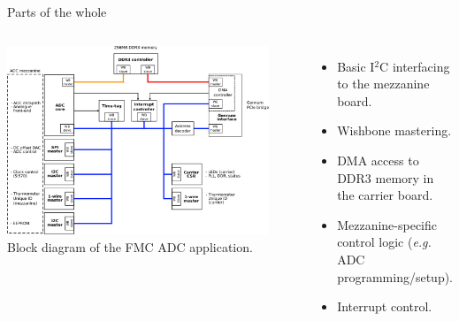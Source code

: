 \documentclass[compress,red]{beamer}
\begin{document}
\begin{frame}{Parts of the whole}
\begin{columns}[c]
   \centering
   \includegraphics[width=0.9\textwidth]{firmware_arch.pdf}
   \vspace{1pc}
   {\footnotesize
       Block diagram of the FMC ADC application.}
\footnotesize
\begin{itemize}
\pause\item Basic I${}^2$C interfacing to the mezzanine board.
\pause\item Wishbone mastering.
\pause\item DMA access to DDR3 memory in the carrier board.
\pause\item Mezzanine-specific control logic (\emph{e.g.} ADC programming/setup).
\pause\item Interrupt control.
\end{itemize}
\end{columns}
\end{frame}
\end{document}
